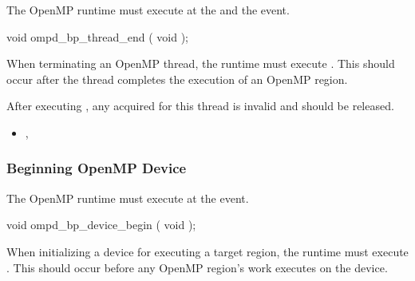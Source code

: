 \summary
The OpenMP runtime must execute %
 at the  and the  event.


\begin{cspecific}
\begin{ompSyntax}
void ompd_bp_thread_end ( void );
\end{ompSyntax}
\end{cspecific}


\descr

When terminating an OpenMP thread, the runtime must 
execute .
This should occur after the thread completes the execution of an OpenMP region.

After 
executing , any  acquired for this thread 
is invalid and should be released.

%
%


\crossreferences
\begin{itemize}
\item
  , 
\end{itemize}

\subsubsection{Beginning OpenMP Device}
\label{subsubsec:ompd_bp_device_begin}

\summary
The OpenMP runtime must execute 
 at the  event.


\begin{cspecific}
\begin{ompSyntax}
void ompd_bp_device_begin ( void );
\end{ompSyntax}
\end{cspecific}


\descr

When initializing a device for executing a target region, the runtime must 
execute .
This should occur before any OpenMP region's work executes on the device.

